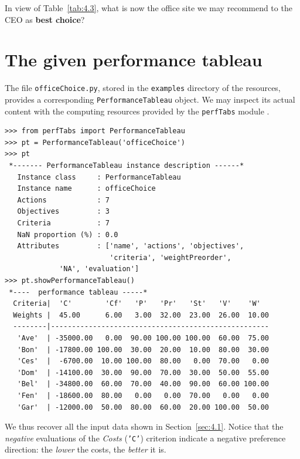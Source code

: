 In view of Table~\vref{tab:4.3}, what is now the office site we may recommend to the CEO as \textbf{best choice}?

\section{The given performance tableau}
\label{sec:4.2}


The file \texttt{officeChoice.py}, stored in the \texttt{examples} directory of the \Digraph resources, provides a corresponding \texttt{PerformanceTableau} object. We may inspect its actual content with the computing resources provided by the \texttt{perfTabs} module .
\begin{lstlisting}[caption={Inspecting the \texttt{officeChoice} performance tableau.},label=list:4.1]
>>> from perfTabs import PerformanceTableau
>>> pt = PerformanceTableau('officeChoice')
>>> pt
 *------- PerformanceTableau instance description ------*
   Instance class     : PerformanceTableau
   Instance name      : officeChoice
   Actions            : 7
   Objectives         : 3
   Criteria           : 7
   NaN proportion (%) : 0.0
   Attributes         : ['name', 'actions', 'objectives',
                         'criteria', 'weightPreorder',
			 'NA', 'evaluation']
>>> pt.showPerformanceTableau()
 *----  performance tableau -----*
  Criteria|  'C'        'Cf'   'P'   'Pr'   'St'   'V'    'W'   
  Weights |  45.00      6.00   3.00  32.00  23.00  26.00  10.00    
  --------|----------------------------------------------------
   'Ave'  | -35000.00   0.00  90.00 100.00 100.00  60.00  75.00  
   'Bon'  | -17800.00 100.00  30.00  20.00  10.00  80.00  30.00  
   'Ces'  |  -6700.00  10.00 100.00  80.00   0.00  70.00   0.00  
   'Dom'  | -14100.00  30.00  90.00  70.00  30.00  50.00  55.00  
   'Bel'  | -34800.00  60.00  70.00  40.00  90.00  60.00 100.00  
   'Fen'  | -18600.00  80.00   0.00   0.00  70.00   0.00   0.00  
   'Gar'  | -12000.00  50.00  80.00  60.00  20.00 100.00  50.00  
\end{lstlisting}

We thus recover all the input data shown in Section~\ref{sec:4.1}. Notice that the \emph{negative} evaluations of the \emph{Costs} (\texttt{'C'}) criterion indicate a negative preference direction: the \emph{lower} the costs, the \emph{better} it is.

